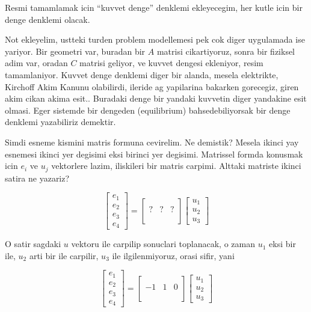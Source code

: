\documentclass[12pt,fleqn]{article}\usepackage{../../common}
\begin{document}
Resmi tamamlamak icin ``kuvvet denge'' denklemi ekleyecegim, her kutle
icin bir denge denklemi olacak.

Not ekleyelim, ustteki turden problem modellemesi pek cok diger uygulamada ise
yariyor. Bir geometri var, buradan bir $A$ matrisi cikartiyoruz, sonra bir
fiziksel adim var, oradan $C$ matrisi geliyor, ve kuvvet dengesi ekleniyor,
resim tamamlaniyor. Kuvvet denge denklemi diger bir alanda, mesela elektrikte,
Kirchoff Akim Kanunu olabilirdi, ileride ag yapilarina bakarken gorecegiz, giren
akim cikan akima esit.. Buradaki denge bir yandaki kuvvetin diger yandakine esit
olmasi. Eger sistemde bir dengeden (equilibrium) bahsedebiliyorsak bir denge
denklemi yazabiliriz demektir.

Simdi esneme kismini matris formuna cevirelim. Ne demistik? Mesela ikinci yay
esnemesi ikinci yer degisimi eksi birinci yer degisimi. Matrissel formda
konusmak icin $e_i$ ve $u_j$  vektorlere lazim, iliskileri bir matris carpimi.
Alttaki matriste ikinci satira ne yazariz?

$$
\left[\begin{array}{c}
e_1 \\ e_2 \\ e_3 \\ e_4
\end{array}\right] =
\left[\begin{array}{cccc}
 & & \\ ? & ? & ? \\  & & \\  & & 
\end{array}\right]
\left[\begin{array}{c}
u_1 \\ u_2 \\ u_3 
\end{array}\right]
$$

O satir sagdaki $u$ vektoru ile carpilip sonuclari toplanacak, o zaman
$u_1$ eksi bir ile, $u_2$ arti bir ile carpilir, $u_3$ ile ilgilenmiyoruz,
orasi sifir, yani

$$
\left[\begin{array}{c}
e_1 \\ e_2 \\ e_3 \\ e_4
\end{array}\right] =
\left[\begin{array}{cccc}
 & & \\ -1 & 1 & 0 \\  & & \\  & & 
\end{array}\right]
\left[\begin{array}{c}
u_1 \\ u_2 \\ u_3 
\end{array}\right]
$$
\end{document}
